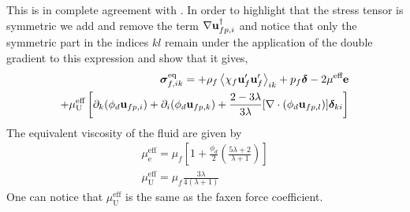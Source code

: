 This is in complete agreement with \citet[Appendix A]{zhang1997momentum}. 
In order to highlight that the stress tensor is symmetric we add and remove the term $ \mathbf{\nabla} \textbf{u}_{fp,i}^\dagger$ and notice that only the symmetric part in the indices $kl$ remain under the application of the double gradient to this expression and show that it gives, 
\begin{align}
    \bm{\sigma}^\text{eq}_{f,ik} =
    + \rho_f\left<\chi_f\textbf{u}_f'\textbf{u}_f'\right>_{ik} 
    + p_f \bm\delta
    - 2\mu^\text{eff} \textbf{e}\\
    + 
    \mu_\text{U}^\text{eff}
    \left[
        \partial_k   (\phi_d\textbf{u}_{fp,i})
        + \partial_i (\phi_d\textbf{u}_{fp,k})
        + \frac{2-3\lambda}{3\lambda}  [\mathbf{\nabla}\cdot (\phi_d\textbf{u}_{fp,l})]\bm\delta_{ki}
    \right]
    \label{eq:fluid_phase_stress}
\end{align} 
The equivalent viscosity of the fluid are given by 
\begin{align*}
    \mu^\text{eff}_\text{e} = \mu_f \left[
        1
        +\frac{\phi_d}{2}\left(
            \frac{5\lambda +2}{\lambda +1}
        \right)
    \right]\\
    \mu^\text{eff}_\text{U}
    = \mu_f\frac{ 3\lambda}{4(\lambda +1) }
\end{align*}
One can notice that $\mu^\text{eff}_\text{U}$ is the same as the faxen force coefficient. 